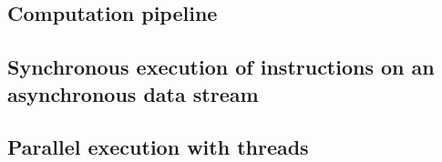 \subsection{\label{sec:computationpipe}Computation pipeline}


\subsection{Synchronous execution of instructions on an asynchronous data stream}


\subsection{Parallel execution with threads}
